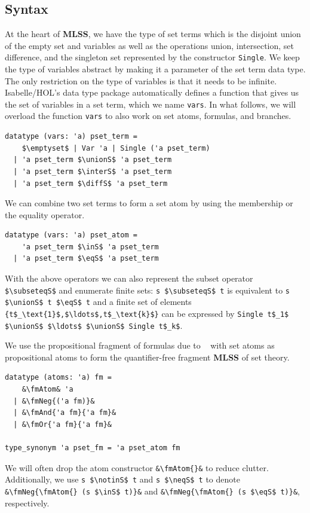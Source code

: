 \documentclass[runningheads]{llncs}
\newcommand{\MLSS}{\textbf{MLSS}}
\newcommand{\unionS}{\sqcup_\text{s}}
\newcommand{\interS}{\sqcap_\text{s}}
\newcommand{\diffS}{-_\text{s}}
\newcommand{\inS}{\in_\text{s}}
\newcommand{\notinS}{\notin_\text{s}}
\newcommand{\eqS}{=_\text{s}}
\newcommand{\neqS}{\neq_\text{s}}
\newcommand{\subseteqS}{\sqsubseteq_\text{s}}
\newcommand{\fmAndSymbol}{\boldsymbol{\land}}
\newcommand{\fmAnd}[2]{#1 $\fmAndSymbol$ #2}
\newcommand{\fmOr}[2]{#1 $\boldsymbol{\lor}$ #2}
\newcommand{\fmNegSymbol}{\boldsymbol{\neg}}
\newcommand{\fmNeg}[1]{$\fmNegSymbol\:$#1}
\newcommand{\fmAtom}{\textbf{A}}
\begin{document}
\subsection{Syntax}
At the heart of \MLSS{}, we have the type of set terms which is the disjoint union of the empty set and variables as well as the operations union, intersection, set difference, and the singleton set represented by the constructor \lstinline!Single!.
We keep the type of variables abstract by making it a parameter of the set term data type.
The only restriction on the type of variables is that it needs to be infinite.
Isabelle/HOL's data type package automatically defines a function that gives us the set of variables in a set term, which we name \lstinline!vars!.
In what follows, we will overload the function \lstinline!vars! to also work on set atoms, formulas, and branches.
\begin{lstlisting}
datatype (vars: 'a) pset_term =
    $\emptyset$ | Var 'a | Single ('a pset_term)
  | 'a pset_term $\unionS$ 'a pset_term
  | 'a pset_term $\interS$ 'a pset_term
  | 'a pset_term $\diffS$ 'a pset_term
\end{lstlisting}
We can combine two set terms to form a set atom by using the membership or the equality operator.
\begin{lstlisting}
datatype (vars: 'a) pset_atom =
    'a pset_term $\inS$ 'a pset_term
  | 'a pset_term $\eqS$ 'a pset_term
\end{lstlisting}
With the above operators we can also represent the subset operator \lstinline!$\subseteqS$! and enumerate finite sets: \lstinline!s $\subseteqS$ t! is equivalent to \lstinline!s $\unionS$ t $\eqS$ t! and a finite set of elements \lstinline!{t$_\text{1}$,$\ldots$,t$_\text{k}$}! can be expressed by \lstinline!Single t$_1$ $\unionS$ $\ldots$ $\unionS$ Single t$_k$!.

We use the propositional fragment of formulas due to \citeauthor{lqe}~\cite{lqe} with set atoms as propositional atoms to form the quantifier-free fragment \MLSS{} of set theory.
\begin{lstlisting}
datatype (atoms: 'a) fm =
    &\fmAtom& 'a
  | &\fmNeg{('a fm)}&
  | &\fmAnd{'a fm}{'a fm}&
  | &\fmOr{'a fm}{'a fm}&

type_synonym 'a pset_fm = 'a pset_atom fm
\end{lstlisting}
We will often drop the atom constructor \lstinline!&\fmAtom{}&! to reduce clutter.
Additionally, we use \lstinline!s $\notinS$ t! and \lstinline!s $\neqS$ t! to denote \lstinline!&\fmNeg{\fmAtom{} (s $\inS$ t)}&! and \lstinline!&\fmNeg{\fmAtom{} (s $\eqS$ t)}&!, respectively.
\end{document}
